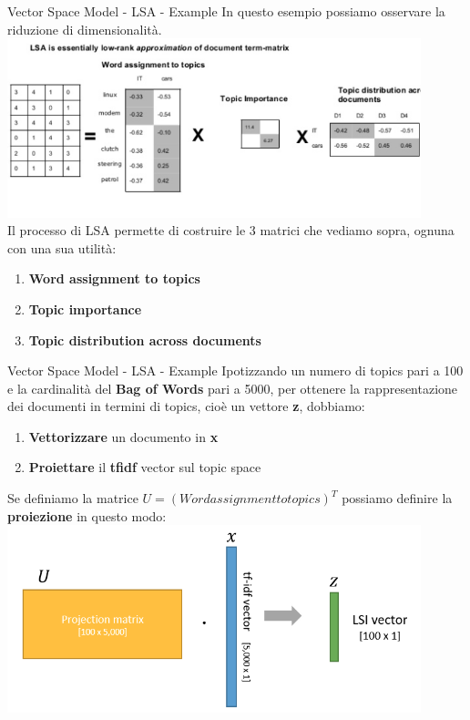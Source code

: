 \documentclass[british]{beamer}
\begin{document}
\begin{frame}{Vector Space Model - LSA - Example}
	In questo esempio possiamo osservare la riduzione di dimensionalit\`{a}.
	\includegraphics[width=0.9\textwidth, height=0.5
	\textheight]{./Imgs/LSA2}\\
	Il processo di LSA permette di costruire le 3 matrici che vediamo sopra, ognuna con una sua utilit\`{a}:
	\begin{enumerate}
		\item \textbf{Word assignment to topics}
		\item \textbf{Topic importance}
		\item \textbf{Topic distribution across documents}
	\end{enumerate}
\end{frame}

\begin{frame}{Vector Space Model - LSA - Example}
	Ipotizzando un numero di topics pari a 100 e la cardinalit\`{a} del \textbf{Bag of Words} pari a 5000, per ottenere la rappresentazione dei documenti in termini di topics, cioè un vettore \textbf{z}, dobbiamo:
	\begin{enumerate}
		\item \textbf{Vettorizzare} un documento in \textbf{x}
		\item \textbf{Proiettare} il \textbf{tfidf} vector sul topic space
	\end{enumerate}
	Se definiamo la matrice \(U = (Word assignment to topics)^T\) possiamo definire la \textbf{proiezione} in questo modo:
	\includegraphics[width=0.9\textwidth, height=0.5\textheight]{./Imgs/LSI}

\end{frame}
\end{document}
